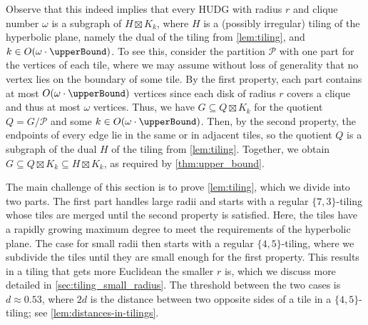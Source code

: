 \documentclass[a4paper,english,cleveref,thm-restate]{lipics-v2021}
\newcommand{\calP}{\ensuremath{\mathcal{P}}\xspace}
\begin{document}

\tiling*

Observe that this indeed implies that every HUDG with radius $ r $ and clique number $ \omega $ is a subgraph of $ H \boxtimes K_k $, where $ H $ is a (possibly irregular) tiling of the hyperbolic plane, namely the dual of the tiling from \cref{lem:tiling}, and $ k \in O(\omega \cdot \upperBound) $.
To see this, consider the partition \calP with one part for the vertices of each tile, where we may assume without loss of generality that no vertex lies on the boundary of some tile.
By the first property, each part contains at most $ O(\omega \cdot \upperBound) $ vertices since each disk of radius $ r $ covers a clique and thus at most $ \omega $ vertices.
Thus, we have $ G \subseteq Q \boxtimes K_k $ for the quotient $ Q = G / \calP $ and some $ k \in {O(\omega \cdot \upperBound)} $.
Then, by the second property, the endpoints of every edge lie in the same or in adjacent tiles, so the quotient $ Q $ is a subgraph of the dual $ H $ of the tiling from \cref{lem:tiling}.
Together, we obtain $ G \subseteq Q \boxtimes K_k \subseteq H \boxtimes K_k $, as required by \cref{thm:upper_bound}.

The main challenge of this section is to prove \cref{lem:tiling}, which we divide into two parts.
The first part handles large radii and starts with a regular $ \{7, 3\} $-tiling whose tiles are merged until the second property is satisfied.
Here, the tiles have a rapidly growing maximum degree to meet the requirements of the hyperbolic plane.
The case for small radii then starts with a regular $ \{ 4, 5 \} $-tiling, where we subdivide the tiles until they are small enough for the first property.
This results in a tiling that gets more Euclidean the smaller $ r $ is, which we discuss more detailed in \cref{sec:tiling_small_radius}.
The threshold between the two cases is $ d \approx 0.53 $, where $ 2d $ is the distance between two opposite sides of a tile in a $ \{ 4, 5 \} $-tiling; see \cref{lem:distances-in-tilings}.
\end{document}

